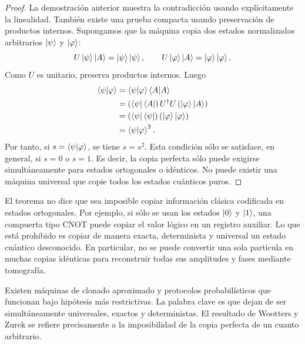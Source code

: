 \documentclass[../main.tex]{subfiles}
\begin{document}
\begin{proof}
La demostración anterior muestra la contradicción usando explícitamente la linealidad. También existe una prueba compacta usando preservación de productos internos. Supongamos que la máquina copia dos estados normalizados arbitrarios $\ket{\psi}$ y $\ket{\varphi}$:
\begin{equation*}
    U\ket{\psi}\ket{A}=\ket{\psi}\ket{\psi},
    \qquad
    U\ket{\varphi}\ket{A}=\ket{\varphi}\ket{\varphi}.
\end{equation*}
Como $U$ es unitario, preserva productos internos. Luego
\begin{align*}
    \braket{\psi|\varphi}
    &=\braket{\psi|\varphi}\braket{A|A}\\
    &=\left(\bra{\psi}\bra{A}\right)U^\dagger U\left(\ket{\varphi}\ket{A}\right)\\
    &=\left(\bra{\psi}\bra{\psi}\right)\left(\ket{\varphi}\ket{\varphi}\right)\\
    &=\braket{\psi|\varphi}^2.
\end{align*}
Por tanto, si $s=\braket{\psi|\varphi}$, se tiene $s=s^2$. Esta condición sólo se satisface, en general, si $s=0$ o $s=1$. Es decir, la copia perfecta sólo puede exigirse simultáneamente para estados ortogonales o idénticos. No puede existir una máquina universal que copie todos los estados cuánticos puros.
\end{proof}

\begin{observacion}
El teorema no dice que sea imposible copiar información clásica codificada en estados ortogonales. Por ejemplo, si sólo se usan los estados $\ket{0}$ y $\ket{1}$, una compuerta tipo CNOT puede copiar el valor lógico en un registro auxiliar. Lo que está prohibido es copiar de manera exacta, determinista y universal un estado cuántico desconocido. En particular, no se puede convertir una sola partícula en muchas copias idénticas para reconstruir todas sus amplitudes y fases mediante tomografía.
\end{observacion}

\begin{comentario}
Existen máquinas de clonado aproximado y protocolos probabilísticos que funcionan bajo hipótesis más restrictivas. La palabra clave es que dejan de ser simultáneamente universales, exactos y deterministas. El resultado de Wootters y Zurek se refiere precisamente a la imposibilidad de la copia perfecta de un cuanto arbitrario.
\end{comentario}
\end{document}
